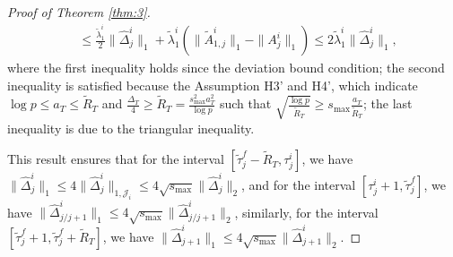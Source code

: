 \documentclass[11pt]{article}
\begin{document}
\begin{proof}[Proof of Theorem \ref{thm:3}]
\begin{align*}
    &\leq \frac{\widetilde{\lambda}_1^i}{2}\|\widehat{\Delta}^i_j\|_1 + \widetilde{\lambda}_1^i\left(\|\widetilde{A}_{1,j}^i\|_1 - \|A_j^i\|_1\right) \leq 2\widetilde{\lambda}_1^i\|\widehat{\Delta}_j^i\|_1,
\end{align*}
where the first inequality holds since the deviation bound condition; the second inequality is satisfied because the Assumption H3' and H4', which indicate $\log p \leq a_T \leq \widetilde{R}_T$ and $\frac{\Delta_T}{4} \geq \widetilde{R}_T = \frac{s_{\max}^2a_T^2}{\log p}$ such that $\sqrt{\frac{\log p}{\widetilde{R}_T}} \geq s_{\max}\frac{a_T}{\widetilde{R}_T}$; the last inequality is due to the triangular inequality.

This result ensures that for the interval $[\widetilde{\tau}^f_j-\widetilde{R}_T, \tau_j^i]$, we have $\|\widehat{\Delta}^i_j\|_1 \leq 4\|\widehat{\Delta}_j^i\|_{1,\mathcal{J}_i} \leq 4\sqrt{s_{\max}}\|\widehat{\Delta}^i_j\|_2$, and for the interval $[\tau_j^i+1, \widetilde{\tau}^f_j]$, we have $\|\widehat{\Delta}^i_{j/j+1}\|_1 \leq 4\sqrt{s_{\max}}\|\widehat{\Delta}_{j/j+1}^i\|_2$, similarly, for the interval $[\widetilde{\tau}^f_j+1, \widetilde{\tau}^f_j + \widetilde{R}_T]$, we have $\|\widehat{\Delta}^i_{j+1}\|_1 \leq 4\sqrt{s_{\max}}\|\widehat{\Delta}^i_{j+1}\|_2$. 



\end{proof}
\end{document}
